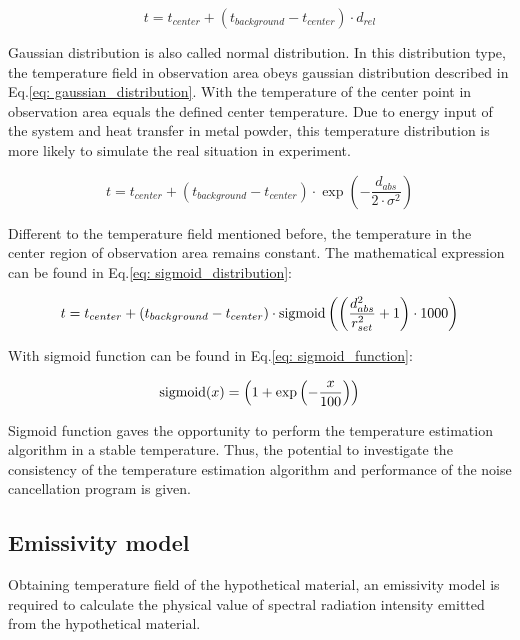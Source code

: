 \begin{equation}
    t = t_{center} + (t_{background} - t_{center}) \cdot d_{rel}
    \label{eq: linear_distribution}
\end{equation}


Gaussian distribution is also called normal distribution. In this distribution 
type, the temperature field in observation area obeys gaussian distribution described 
in Eq.\ref{eq: gaussian_distribution}. With the temperature of the center 
point in observation area equals the defined center temperature. Due to energy input 
of the system and heat transfer in metal powder, this temperature distribution 
is more likely to simulate the real situation in experiment.

\begin{equation}
    t = t_{center} + (t_{background} - t_{center}) \cdot \exp {\left(-\frac{d_{abs}}{2 \cdot \sigma^2}\right)}
    \label{eq: gaussian_distribution}
\end{equation}


Different to the temperature field mentioned before, the temperature in the center region 
of observation area remains constant. The mathematical expression can be found in 
Eq.\ref{eq: sigmoid_distribution}:

\begin{equation}
    t = t_{center} + (t_{background} - t_{center}) \cdot \operatorname{sigmoid}\left( \left(\frac{d_{abs}^2}{r_{set}^2} + 1\right)\cdot 1000\right)
    \label{eq: sigmoid_distribution}
\end{equation}


With sigmoid function can be found in Eq.\ref{eq: sigmoid_function}:

\begin{equation}
    \operatorname{sigmoid}(x) = \left(1 + \exp\left(-\frac{x}{100}\right)\right)
    \label{eq: sigmoid_function}
\end{equation}


Sigmoid function gaves the opportunity to perform the temperature estimation algorithm 
in a stable temperature. Thus, the potential to investigate the consistency of the 
temperature estimation algorithm and performance of the noise cancellation program is 
given. 


\subsection{Emissivity model}%
Obtaining temperature field of the hypothetical material, an emissivity model 
is required to calculate the physical value of spectral radiation intensity 
emitted from the hypothetical material.


